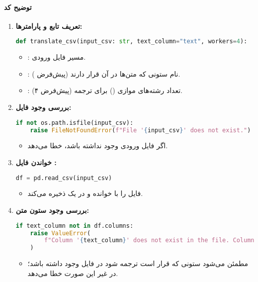 \documentclass{article}
\begin{document}
\paragraph{توضیح کد }

\begin{enumerate}
    \item \textbf{تعریف تابع و پارامترها:}
    \begin{latin}
    \begin{lstlisting}[language=Python]
def translate_csv(input_csv: str, text_column="text", workers=4):
    \end{lstlisting}
    \end{latin}
    \begin{itemize}
        \item {}: مسیر فایل  ورودی.
        \item {}: نام ستونی که متن‌ها در آن قرار دارند (پیش‌فرض ).
        \item {}: تعداد رشته‌های موازی () برای ترجمه (پیش‌فرض ۴).
    \end{itemize}

    \item \textbf{بررسی وجود فایل:}
    \begin{latin}
    \begin{lstlisting}[language=Python]
if not os.path.isfile(input_csv):
    raise FileNotFoundError(f"File '{input_csv}' does not exist.")
    \end{lstlisting}
    \end{latin}
    \begin{itemize}
        \item اگر فایل ورودی وجود نداشته باشد، خطا می‌دهد.
    \end{itemize}

    \item \textbf{خواندن فایل :}
    \begin{latin}
    \begin{lstlisting}[language=Python]
df = pd.read_csv(input_csv)
    \end{lstlisting}
    \end{latin}
    \begin{itemize}
        \item فایل  را با  خوانده و در یک  ذخیره می‌کند.
    \end{itemize}

    \item \textbf{بررسی وجود ستون متن:}
    \begin{latin}
    \begin{lstlisting}[language=Python]
if text_column not in df.columns:
    raise ValueError(
        f"Column '{text_column}' does not exist in the file. Columns: {df.columns.tolist()}"
    )
    \end{lstlisting}
    \end{latin}
    \begin{itemize}
        \item مطمئن می‌شود ستونی که قرار است ترجمه شود در فایل وجود داشته باشد؛ در غیر این صورت خطا می‌دهد.
    \end{itemize}


\end{enumerate}
\end{document}
